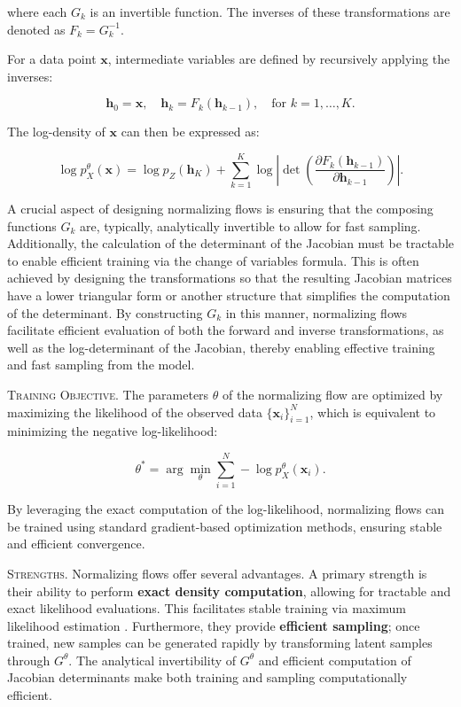 \noindent where each $G_k$ is an invertible function. The inverses of these transformations are denoted as $F_k = G_k^{-1}$.

\noindent For a data point $\mathbf{x}$, intermediate variables are defined by recursively applying the inverses:

\[
\mathbf{h}_0 = \mathbf{x}, \quad \mathbf{h}_k = F_k(\mathbf{h}_{k-1}), \quad \text{for } k = 1, \dots, K.
\]

\noindent The log-density of $\mathbf{x}$ can then be expressed as:

\[
\log p^\theta_X(\mathbf{x}) = \log p_Z(\mathbf{h}_K) + \sum_{k=1}^{K} \log \left| \det \left( \frac{\partial F_k(\mathbf{h}_{k-1})}{\partial \mathbf{h}_{k-1}} \right) \right|.
\]

A crucial aspect of designing normalizing flows is ensuring that the composing functions \( G_k \) are, typically, analytically invertible to allow for fast sampling. Additionally, the calculation of the determinant of the Jacobian must be tractable to enable efficient training via the change of variables formula. This is often achieved by designing the transformations so that the resulting Jacobian matrices have a lower triangular form or another structure that simplifies the computation of the determinant. By constructing \( G_k \) in this manner, normalizing flows facilitate efficient evaluation of both the forward and inverse transformations, as well as the log-determinant of the Jacobian, thereby enabling effective training and fast sampling from the model.

\textsc{Training Objective.} The parameters $\theta$ of the normalizing flow are optimized by maximizing the likelihood of the observed data $\{\mathbf{x}_i\}_{i=1}^N$, which is equivalent to minimizing the negative log-likelihood:

\[
\theta^* = \arg \min_{\theta} \sum_{i=1}^N -\log p^\theta_X(\mathbf{x}_i).
\]

By leveraging the exact computation of the log-likelihood, normalizing flows can be trained using standard gradient-based optimization methods, ensuring stable and efficient convergence.

\textsc{Strengths.} Normalizing flows offer several advantages. A primary strength is their ability to perform \textbf{exact density computation}, allowing for tractable and exact likelihood evaluations. This facilitates stable training via maximum likelihood estimation \cite{papamakarios2019normalizing}. Furthermore, they provide \textbf{efficient sampling}; once trained, new samples can be generated rapidly by transforming latent samples through \( G^\theta \). The analytical invertibility of \( G^\theta \) and efficient computation of Jacobian determinants make both training and sampling computationally efficient.

